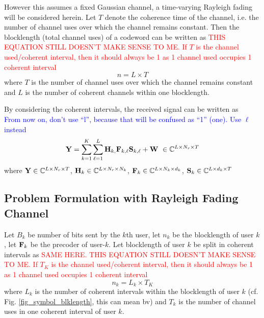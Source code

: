 \documentclass[a4paper, 12pt, onecolumn, journal, twoside, draftclsnofoot]{IEEEtran}
\begin{document}
However this assumes a fixed Gaussian channel, a time-varying Rayleigh fading will be considered herein. Let $T$ denote the coherence time of the channel, i.e. the number of channel uses over which the channel remains constant.  Then the blocklength (total channel uses) of a codeword can be written as
\textcolor{red}{THIS EQUATION STILL DOESN'T MAKE SENSE TO ME.  If $T$ is the channel used/coherent interval, then it should always be 1 as 1 channel used occupies 1 coherent interval}
\begin{equation*}
	n = L \times T
\end{equation*}
where $T$ is the number of channel uses over which the channel remains constant and $L$ is the number of coherent channels within one blocklength.

By considering the coherent intervals, the received signal can be written as \\
\textcolor{blue}{From now on, don't use ``l'', because that will be confused as ``1'' (one).  Use $\ell$ instead}
\begin{equation*}
	{\bf Y} = \sum_{k=1}^K \sum_{\ell = 1}^L {\bf H}_{k, } {\bf F}_{k, \ell}  {\bf S}_{k, \ell} + {\bf W} \ \in \mathbb{C}^{L \times N_r \times T}
\end{equation*}
where ${\bf Y} \in \mathbb{C}^{L \times N_r \times T}$, ${\bf H}_k \in \mathbb{C}^{L \times N_r \times N_k}$, ${\bf F}_k \in \mathbb{C}^{L \times N_k \times d_k}$, ${\bf S}_k \in \mathbb{C}^{L \times d_k \times T}$


\subsection{Problem Formulation with Rayleigh Fading Channel}
Let $B_k$ be number of bits sent by the $k$th user, let $n_k$ be the blocklength of user $k$, let ${\bf F}_k$ be the precoder of user-$k$.  Let blocklength of user $k$ be split in coherent intervals as 
\textcolor{red}{SAME HERE. THIS EQUATION STILL DOESN'T MAKE SENSE TO ME.  If $T_K$ is the channel used/coherent interval, then it should always be 1 as 1 channel used occupies 1 coherent interval}
\begin{equation*}
	n_k = L_k \times T_K
\end{equation*}
where $L_k$ is the number of coherent intervals within the blocklength of user $k$ (cf. Fig. \ref{fig_symbol_blklength}, this can mean  bv) and $T_k$ is the number of channel uses in one coherent interval of user $k$.
\end{document}
